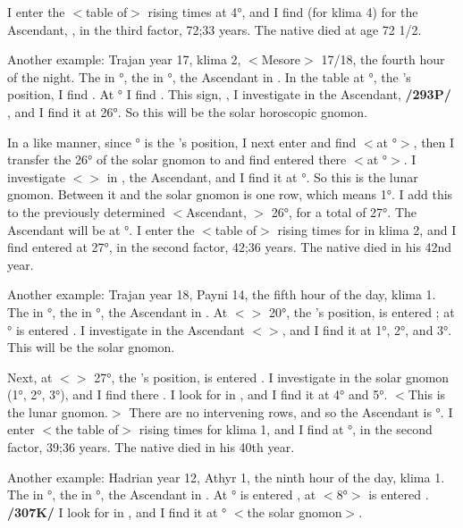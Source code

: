 I enter the $<$table of$>$ rising times at 4°, and I find (for klima 4) for the Ascendant, \Scorpio, in the third factor, 72;33 years.
The native died at age 72 1/2.

Another example: Trajan year 17, klima 2, $<$Mesore$>$ 17/18, the fourth hour of the night. The \Sun\xspace in °, the \Moon\xspace in \Taurus\xspace 14°, the Ascendant in \Aries. In the table at \Leo\xspace 22°, the \Sun’s position, I find \Virgo. At \Virgo\xspace 22° I find \Cancer. This sign, \Cancer, I investigate in the Ascendant, \textbf{/293P/} \Aries, and I find it at 26°. So this will be the solar horoscopic gnomon. 

In a like manner, since \Taurus\xspace 14° is the \Moon’s position, I next enter \Taurus\xspace and find \Gemini\xspace $<$at \Taurus\xspace 14°$>$, then I transfer the 26° of the solar gnomon to \Gemini\xspace and find \Aquarius\xspace entered there $<$at \Gemini\xspace 26°$>$. I investigate $<$\Aquarius$>$ in \Aries, the Ascendant, and I find it at °. So this is the lunar gnomon. Between it and the solar gnomon is one row, which means 1°. I add this to the previously determined $<$Ascendant, \Aries$>$ 26°, for
a total of 27°. The Ascendant will be at \Aries\xspace 27°. I enter the $<$table of$>$ rising times for \Aries\xspace in klima 2, and I find entered at 27°, in the second factor, 42;36 years. The native died in his 42nd year.

Another example: Trajan year 18, Payni 14, the fifth hour of the day, klima 1. The \Sun\xspace in \Gemini\xspace 20°, the \Moon\xspace in \Taurus\xspace 27°, the Ascendant in \Virgo. At $<$\Gemini$>$ 20°, the \Sun’s position, is entered \Cancer; at \Cancer\xspace 20° is entered \Virgo. I investigate \Virgo\xspace in the Ascendant $<$\Virgo$>$, and I find it at 1°, 2°, and 3°. This will be the solar gnomon. 

Next, at $<$\Taurus$>$ 27°, the \Moon’s position, is entered
\Aries. I investigate in \Aries the solar gnomon (1°, 2°, 3°), and I find there \Leo. I look for \Leo\xspace in \Virgo, and I find it at 4° and 5°. $<$This is the lunar gnomon.$>$ There are no intervening rows, and so the Ascendant is \Virgo\xspace 1°. I enter $<$the table of$>$ rising times for klima 1, and I find at \Virgo\xspace 1°, in the second
factor, 39;36 years. The native died in his 40th year.

Another example: Hadrian year 12, Athyr 1, the ninth hour of the day, klima 1. The \Sun\xspace in \Scorpio\xspace 8°, the \Moon\xspace in \Capricorn\xspace 17°, the Ascendant in \Pisces. At \Scorpio\xspace 8° is entered \Taurus, at \Taurus $<$8°$>$ is entered \Libra. \textbf{/307K/} I look for \Libra\xspace in \Pisces, and I find it at \Pisces\xspace 9° $<$the solar gnomon$>$. 

